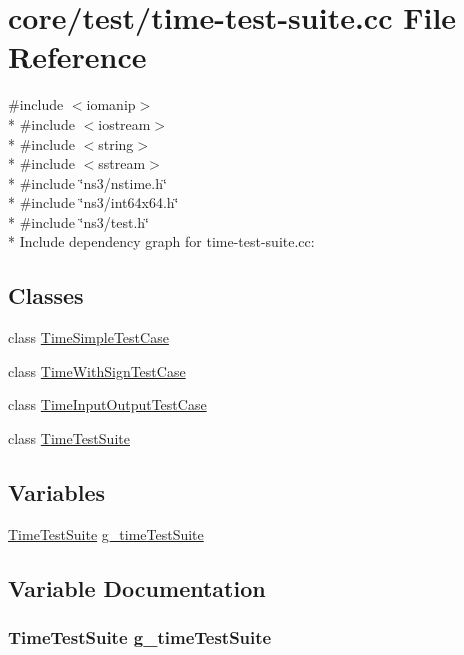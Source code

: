 \hypertarget{time-test-suite_8cc}{}\section{core/test/time-\/test-\/suite.cc File Reference}
\label{time-test-suite_8cc}
{\ttfamily \#include $<$iomanip$>$}\\*
{\ttfamily \#include $<$iostream$>$}\\*
{\ttfamily \#include $<$string$>$}\\*
{\ttfamily \#include $<$sstream$>$}\\*
{\ttfamily \#include \char`\"{}ns3/nstime.\+h\char`\"{}}\\*
{\ttfamily \#include \char`\"{}ns3/int64x64.\+h\char`\"{}}\\*
{\ttfamily \#include \char`\"{}ns3/test.\+h\char`\"{}}\\*
Include dependency graph for time-\/test-\/suite.cc\+:
\subsection*{Classes}
\begin{DoxyCompactItemize}
\item 
class \hyperlink{classTimeSimpleTestCase}{Time\+Simple\+Test\+Case}
\item 
class \hyperlink{classTimeWithSignTestCase}{Time\+With\+Sign\+Test\+Case}
\item 
class \hyperlink{classTimeInputOutputTestCase}{Time\+Input\+Output\+Test\+Case}
\item 
class \hyperlink{classTimeTestSuite}{Time\+Test\+Suite}
\end{DoxyCompactItemize}
\subsection*{Variables}
\begin{DoxyCompactItemize}
\item 
\hyperlink{classTimeTestSuite}{Time\+Test\+Suite} \hyperlink{time-test-suite_8cc_a45e91fa2d180460bd61a5574c87eee00}{g\+\_\+time\+Test\+Suite}
\end{DoxyCompactItemize}


\subsection{Variable Documentation}
\subsubsection[{\texorpdfstring{g\+\_\+time\+Test\+Suite}{g_timeTestSuite}}]{\setlength{\rightskip}{0pt plus 5cm} {\bf Time\+Test\+Suite}  g\+\_\+time\+Test\+Suite\hspace{0.3cm}{\ttfamily [static]}}\hypertarget{time-test-suite_8cc_a45e91fa2d180460bd61a5574c87eee00}{}\label{time-test-suite_8cc_a45e91fa2d180460bd61a5574c87eee00}
